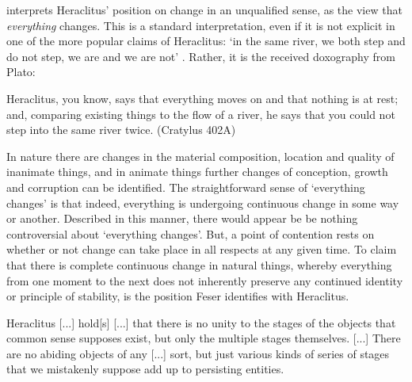 \textcite[][13--20]{feser2019aristotle} interprets Heraclitus' position on change in an unqualified sense, as the view that \emph{everything} changes. This is a standard interpretation, even if it is not explicit in one of the more popular claims of Heraclitus: `in the same river, we both step and do not step, we are and we are not' \autocite[][29]{fitt1983ancilla}. Rather, it is the received doxography from Plato:
\begin{quoting}
Heraclitus, you know, says that everything moves on and that nothing is at rest; and, comparing existing things to the flow of a river, he says that you could not step into the same river twice. (Cratylus 402A)
\end{quoting}
In nature there are changes in the material composition, location and quality of inanimate things, and in animate things further changes of conception, growth and corruption can be identified. The straightforward sense of `everything changes' is that indeed, everything is undergoing continuous change in some way or another. Described in this manner, there would appear be be nothing controversial about `everything changes'. But, a point of contention rests on whether or not change can take place in all respects at any given time. To claim that there is complete continuous change in natural things, whereby everything from one moment to the next does not inherently preserve any continued identity or principle of stability, is the position Feser identifies with Heraclitus.
\begin{quoting}
Heraclitus [...] hold[s] [...] that there is no unity to the stages of the objects that common sense supposes exist, but only the multiple stages themselves. [...] There are no abiding objects of any [...] sort, but just various kinds of series of stages that we mistakenly suppose add up to persisting entities. \parencite[][17]{feser2019aristotle}
\end{quoting}


